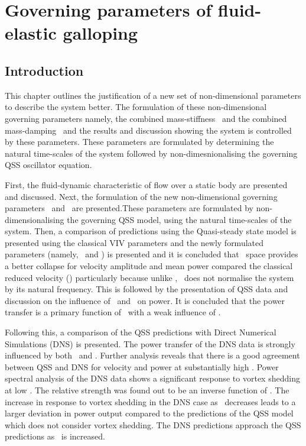 \chapter{Governing parameters of  fluid-elastic galloping}
\label{chap:goven_para}

\section{Introduction}

This chapter outlines the justification of a new set of non-dimensional parameters to describe the system better. The formulation of these non-dimensional governing parameters namely, the combined mass-stiffness \massstiff \ and the combined mass-damping \massdamp \ and the results and discussion showing the system is controlled by these parameters. These parameters are formulated by determining the natural time-scales of the system followed by non-dimesnionalising the governing QSS oscillator equation.  

First, the fluid-dynamic characteristic of flow over a static body are presented and discussed. Next, the formulation of the new non-dimensional governing parameters \massstiff\ and \massdamp\ are presented.These parameters are formulated by non-dimensionalising the governing QSS model, using the natural time-scales of the system. Then, a comparison of predictions using the Quasi-steady state model is presented using the classical VIV parameters and the newly formulated parameters (namely, \massstiff \ and \massdamp) is presented and it is concluded that \massdamp\ space provides a better collapse for velocity amplitude and mean power compared the classical reduced velocity (\ustar) particularly because unlike \ustar, \massdamp\ does not normalise the system by its natural frequency. This is followed by the presentation of QSS data and discussion on the influence of \massstiff \ and \massdamp \ on power. It is concluded that the power transfer is a primary function of \massdamp \ with a weak influence of \massstiff.

Following this, a comparison of the QSS predictions with Direct Numerical Simulations (DNS) is presented. The power transfer of the DNS data is strongly influenced by both \massstiff \ and \massdamp. Further analysis reveals that there is a good agreement between QSS and DNS for velocity and power at substantially high \massstiff. Power spectral analysis of the DNS data shows a significant response to vortex shedding at low \massstiff. The relative strength was found out to be an inverse function of \massstiff. The increase in response to vortex shedding in the DNS case as \massstiff\ decreases leads to a larger deviation in power output compared to the predictions of the QSS model which does not consider vortex shedding. The DNS predictions approach the QSS predictions as \massstiff\ is increased.  


